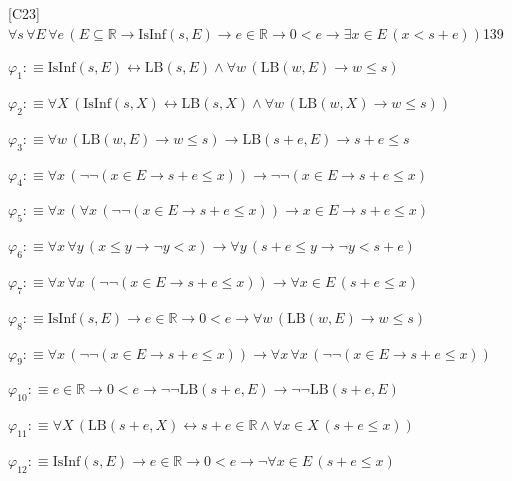 \begin{fullproof}{[C23]}{$\forall s\,\forall E\,\forall e\,(E \subseteq \mathbb{R} \to \mathrm{IsInf}(s,E) \to e \in \mathbb{R} \to 0 < e \to \exists x \in E\,(x < s + e))$}{139}
\begin{ptree}
\end{ptree}
\begin{abbrevlist}
\item $\varphi_{1} :\equiv \mathrm{IsInf}(s,E) \leftrightarrow \mathrm{LB}(s,E) \land \forall w\,(\mathrm{LB}(w,E) \to w \leq s)$
\item $\varphi_{2} :\equiv \forall X\,(\mathrm{IsInf}(s,X) \leftrightarrow \mathrm{LB}(s,X) \land \forall w\,(\mathrm{LB}(w,X) \to w \leq s))$
\item $\varphi_{3} :\equiv \forall w\,(\mathrm{LB}(w,E) \to w \leq s) \to \mathrm{LB}(s + e,E) \to s + e \leq s$
\item $\varphi_{4} :\equiv \forall x\,(\neg \neg (x \in E \to s + e \leq x)) \to \neg \neg (x \in E \to s + e \leq x)$
\item $\varphi_{5} :\equiv \forall x\,(\forall x\,(\neg \neg (x \in E \to s + e \leq x)) \to x \in E \to s + e \leq x)$
\item $\varphi_{6} :\equiv \forall x\,\forall y\,(x \leq y \to \neg y < x) \to \forall y\,(s + e \leq y \to \neg y < s + e)$
\item $\varphi_{7} :\equiv \forall x\,\forall x\,(\neg \neg (x \in E \to s + e \leq x)) \to \forall x \in E\,(s + e \leq x)$
\item $\varphi_{8} :\equiv \mathrm{IsInf}(s,E) \to e \in \mathbb{R} \to 0 < e \to \forall w\,(\mathrm{LB}(w,E) \to w \leq s)$
\item $\varphi_{9} :\equiv \forall x\,(\neg \neg (x \in E \to s + e \leq x)) \to \forall x\,\forall x\,(\neg \neg (x \in E \to s + e \leq x))$
\item $\varphi_{10} :\equiv e \in \mathbb{R} \to 0 < e \to \neg \neg \mathrm{LB}(s + e,E) \to \neg \neg \mathrm{LB}(s + e,E)$
\item $\varphi_{11} :\equiv \forall X\,(\mathrm{LB}(s + e,X) \leftrightarrow s + e \in \mathbb{R} \land \forall x \in X\,(s + e \leq x))$
\item $\varphi_{12} :\equiv \mathrm{IsInf}(s,E) \to e \in \mathbb{R} \to 0 < e \to \neg \forall x \in E\,(s + e \leq x)$

\end{abbrevlist}
\end{fullproof}
